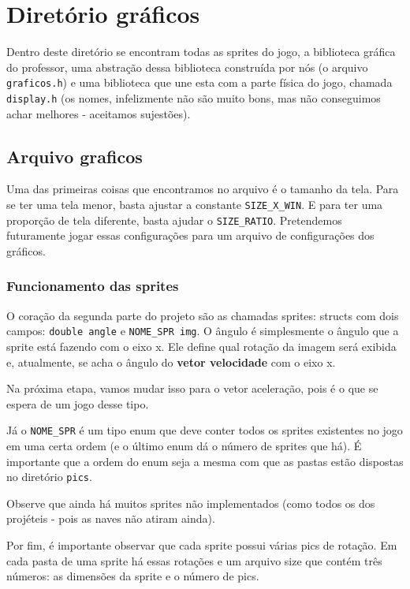 \documentclass[12pt, a4paper]{article}
\begin{document}
    \newpage

    \section{Diretório gráficos}
    Dentro deste diretório se encontram todas as sprites do jogo, a biblioteca 
    gráfica do professor, uma abstração dessa biblioteca construída por nós 
    (o arquivo \texttt{graficos.h}) e uma biblioteca que une esta com a parte
    física do jogo, chamada \texttt{display.h} (os nomes, infelizmente não
    são muito bons, mas não conseguimos achar melhores - aceitamos sujestões).
    
    \subsection{Arquivo graficos}

    Uma das primeiras coisas que encontramos no arquivo é o tamanho da tela. Para 
    se ter uma tela menor, basta ajustar a constante \texttt{SIZE\_X\_WIN}. E para ter uma
    proporção de tela diferente, basta ajudar o \texttt{SIZE\_RATIO}. Pretendemos futuramente
    jogar essas configurações para um arquivo de configurações dos gráficos.

    \subsubsection{Funcionamento das sprites}
    
    O coração da segunda parte do projeto são as chamadas sprites: structs com dois campos:
    \texttt{double angle} e \texttt{NOME\_SPR img}. O ângulo é simplesmente o ângulo que a
    sprite está fazendo com o eixo x. Ele define qual rotação da imagem será exibida e, 
    atualmente, se acha o ângulo do \textbf{vetor velocidade} com o eixo x.

    Na próxima etapa, vamos mudar isso para o vetor aceleração, pois é o que se espera de um jogo
    desse tipo.

    Já o \texttt{NOME\_SPR} é um tipo enum que deve conter todos os sprites
    existentes no jogo em uma certa ordem (e o último enum dá o número
    de sprites que há). É importante que a ordem do enum seja a mesma
    com que as pastas estão dispostas no diretório \texttt{pics}.

    Observe que ainda há muitos sprites não implementados (como todos os
    dos projéteis - pois as naves não atiram ainda).

    Por fim, é importante observar que cada sprite possui várias pics de rotação.
    Em cada pasta de uma sprite há essas rotações e um arquivo size que contém
    três números: as dimensões da sprite e o número de pics.
\end{document}
